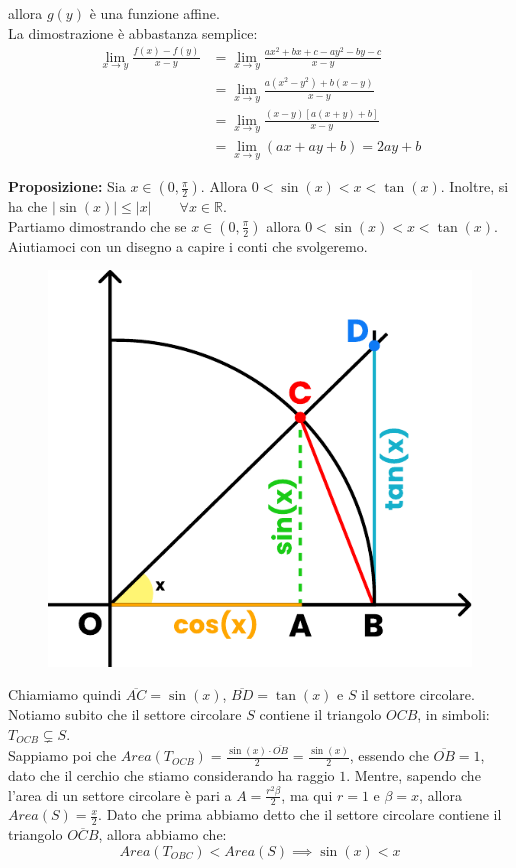 \documentclass{article}
\begin{document}
\noindent allora $g(y)$ è una funzione affine.\\

\noindent La dimostrazione è abbastanza semplice:
\begin{align*}
    \lim_{x \to y} \frac{f(x) - f(y)}{x - y} &= \lim_{x \to y} \frac{ax^2 + bx + c - ay^2 - by - c}{x - y} \\
    &= \lim_{x \to y} \frac{a(x^2 - y^2) + b(x - y)}{x - y} \\
    &= \lim_{x \to y} \frac{(x - y)[a(x + y) + b]}{x - y} \\
    &= \lim_{x \to y} (ax + ay + b) = 2ay + b
\end{align*}

\noindent\textbf{Proposizione:} Sia $x \in (0, \frac{\pi}{2})$. Allora $0 < \sin(x) < x < \tan(x)$. Inoltre, si ha che $|\sin(x)| \leq |x| \qquad \forall x \in \mathbb{R}$.\\

\noindent Partiamo dimostrando che se $x \in (0, \frac{\pi}{2})$ allora $0 < \sin(x) < x < \tan(x)$. Aiutiamoci con un disegno a capire i conti che svolgeremo.

\begin{figure}
\includegraphics[width=0.9\linewidth]{./images/proposition.pdf}
\end{figure}

\noindent Chiamiamo quindi $\overline{AC} = \sin(x)$, $\overline{BD} = \tan(x)$ e $S$ il settore circolare. Notiamo subito che il settore circolare $S$ contiene il triangolo $OCB$, in simboli: $T_{OCB} \subsetneq S$.\\
Sappiamo poi che $Area(T_{OCB}) = \frac{\sin(x) \cdot \overline{OB}}{2} = \frac{\sin(x)}{2}$, essendo che $\overline{OB} = 1$, dato che il cerchio che stiamo considerando ha raggio $1$. Mentre, sapendo che l'area di un settore circolare è pari a $A = \frac{r^2 \beta}{2}$, ma qui $r = 1$ e $\beta = x$, allora $Area(S) = \frac{x}{2}$. Dato che prima abbiamo detto che il settore circolare contiene il triangolo $\overline{OCB}$, allora abbiamo che:
\begin{equation*}
    Area(T_{OBC}) < Area(S) \implies \sin(x) < x
\end{equation*}
\end{document}
